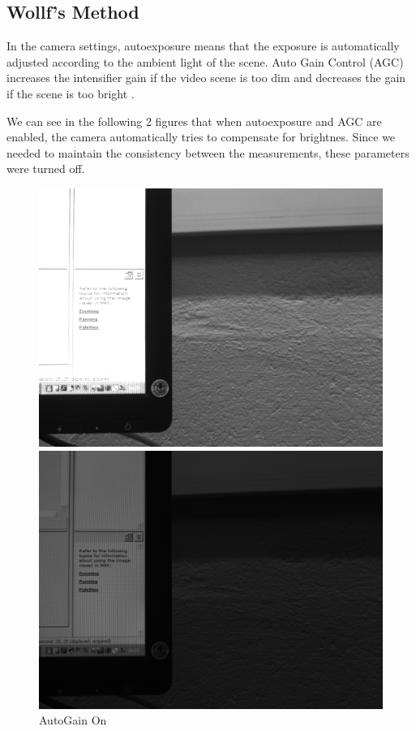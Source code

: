 \documentclass{article}
\begin{document}
\subsection{Wollf's Method}

In the camera settings, autoexposure means that the exposure is 
automatically adjusted according to the ambient light of the scene.
Auto Gain Control (AGC) increases the intensifier gain if the video 
scene is too dim and decreases the gain if the scene is too bright
\cite{fowler2004automatic}.

We can see in the following 2 figures that when autoexposure and AGC are enabled,
the camera automatically tries to compensate for brightnes.
Since we needed to maintain the consistency between the measurements,
these parameters were turned off.

\begin{figure}[ht]
\centering
\begin{minipage}[b]{0.3\linewidth}
\includegraphics[width=1.0\textwidth,natwidth=100,natheight=100]{gainAuto.png}
  \caption{AutoGain On}
  \label{fig:minipage1}
\end{minipage}
\quad
\begin{minipage}[b]{0.3\linewidth}
\includegraphics[width=1.0\textwidth,natwidth=100,natheight=100]{gainManual.png}

\end{minipage}
\end{figure}
\end{document}
